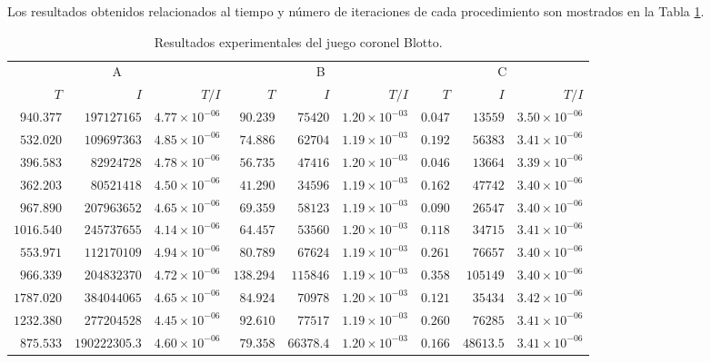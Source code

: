 Los resultados obtenidos relacionados al tiempo y número de iteraciones de cada procedimiento son mostrados en la Tabla \ref{tab:resultados-coronel-blotto}.

\begin{table}[h]
    \centering
    \caption{Resultados experimentales del juego coronel Blotto.}
    \label{tab:resultados-coronel-blotto}
    \scriptsize
    \begin{tabular}{r r r r r r r r r}
    \toprule
    \multicolumn{3}{c}{A} & \multicolumn{3}{c}{B} & \multicolumn{3}{c}{C} \\ \cmidrule(r){1-3} \cmidrule(lr){4-6} \cmidrule(l){7-9}
    $T$ & $I$ & $T/I$ & $T$ & $I$ & $T/I$ & $T$ & $I$ & $T/I$ \\  \cmidrule(r){1-3} \cmidrule(lr){4-6} \cmidrule(l){7-9}
	$940.377$ & $197127165$ & $4.77 {\times} 10^{-06}$ & $90.239$ & $75420$ & $1.20 {\times} 10^{-03}$ & $0.047$ & $13559$ & $3.50 {\times} 10^{-06}$ \\
	$532.020$ & $109697363$ & $4.85 {\times} 10^{-06}$ & $74.886$ & $62704$ & $1.19 {\times} 10^{-03}$ & $0.192$ & $56383$ & $3.41 {\times} 10^{-06}$ \\
	$396.583$ & $82924728$ & $4.78 {\times} 10^{-06}$ & $56.735$ & $47416$ & $1.20 {\times} 10^{-03}$ & $0.046$ & $13664$ & $3.39 {\times} 10^{-06}$ \\
	$362.203$ & $80521418$ & $4.50 {\times} 10^{-06}$ & $41.290$ & $34596$ & $1.19 {\times} 10^{-03}$ & $0.162$ & $47742$ & $3.40 {\times} 10^{-06}$ \\
	$967.890$ & $207963652$ & $4.65 {\times} 10^{-06}$ & $69.359$ & $58123$ & $1.19 {\times} 10^{-03}$ & $0.090$ & $26547$ & $3.40 {\times} 10^{-06}$ \\
	$1016.540$ & $245737655$ & $4.14 {\times} 10^{-06}$ & $64.457$ & $53560$ & $1.20 {\times} 10^{-03}$ & $0.118$ & $34715$ & $3.41 {\times} 10^{-06}$ \\
	$553.971$ & $112170109$ & $4.94 {\times} 10^{-06}$ & $80.789$ & $67624$ & $1.19 {\times} 10^{-03}$ & $0.261$ & $76657$ & $3.40 {\times} 10^{-06}$ \\
	$966.339$ & $204832370$ & $4.72 {\times} 10^{-06}$ & $138.294$ & $115846$ & $1.19 {\times} 10^{-03}$ & $0.358$ & $105149$ & $3.40 {\times} 10^{-06}$ \\
	$1787.020$ & $384044065$ & $4.65 {\times} 10^{-06}$ & $84.924$ & $70978$ & $1.20 {\times} 10^{-03}$ & $0.121$ & $35434$ & $3.42 {\times} 10^{-06}$ \\
	$1232.380$ & $277204528$ & $4.45 {\times} 10^{-06}$ & $92.610$ & $77517$ & $1.19 {\times} 10^{-03}$ & $0.260$ & $76285$ & $3.41 {\times} 10^{-06}$ \\ \cmidrule(r){1-3} \cmidrule(lr){4-6} \cmidrule(l){7-9}
	$875.533$ & $190222305.3$ & $4.60 {\times} 10^{-06}$ & $79.358$ & $66378.4$ & $1.20 {\times} 10^{-03}$ & $0.166$ & $48613.5$ & $3.41 {\times} 10^{-06}$ \\ \bottomrule
    \end{tabular}
\end{table}

